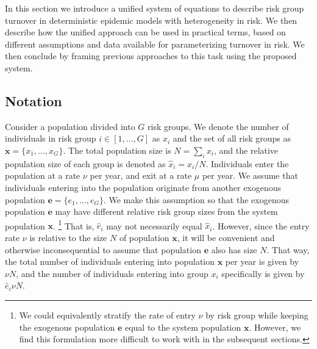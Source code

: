 In this section we introduce a unified system of equations
to describe risk group turnover
in deterministic epidemic models with heterogeneity in risk.
We then describe how the unified approach can be used in practical terms,
based on different assumptions and data available for parameterizing turnover in risk.
We then conclude by framing previous approaches to this task using the proposed system.
\subsection{Notation}
\label{ss:notation}
Consider a population divided into $G$ risk groups.
We denote the number of individuals in risk group $i \in [1, \dots, G]$ as $x_i$
and the set of all risk groups as $\bm{x} = \{x_1, \dots, x_G\}$.
The total population size is $N = \sum_i {x_i}$,
and the relative population size of each group
is denoted as $\hat{x}_i = x_i / N$.
Individuals enter the population at a rate $\nu$ per year,
and exit at a rate $\mu$ per year.
We assume that individuals entering into the population
originate from another exogenous population
$\bm{e} = \{e_1, \dots, e_G\}$.
We make this assumption so that the exogenous population $\bm{e}$
may have different relative risk group sizes from the system population $\bm{x}$.%
\footnote{We could equivalently stratify the rate of entry $\nu$ by risk group
  while keeping the exogenous population $\bm{e}$
  equal to the system population $\bm{x}$.
  However, we find this formulation more difficult to work with
  in the subsequent sections.}
That is, $\hat{e}_i$ may not necessarily equal $\hat{x}_i$.
However, since the entry rate $\nu$ is relative to the size $N$ of population $\bm{x}$,
it will be convenient and otherwise inconsequential to assume that population $\bm{e}$
also has size $N$.
That way, the total number of individuals
entering into population $\bm{x}$ per year is given by $\nu N$,
and the number of individuals
entering into group $x_i$ specifically is given by $\hat{e}_i \nu N$.

